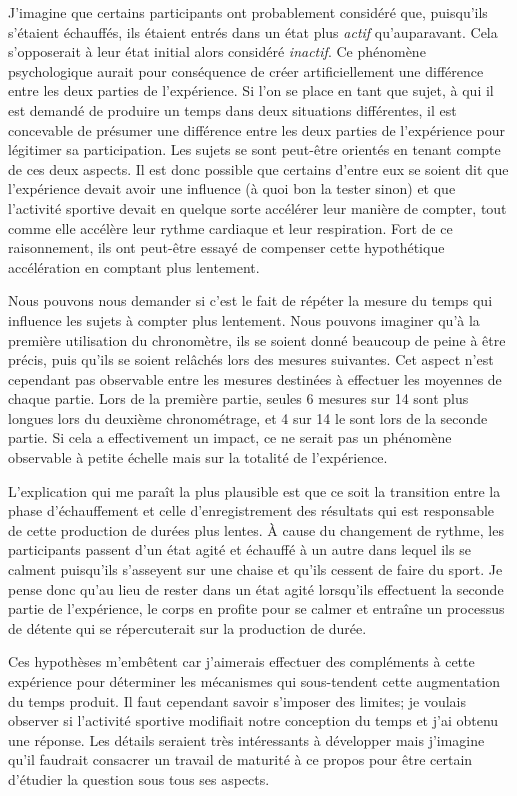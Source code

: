 \documentclass[12pt,fleqn,oneside,french,openany]{book} %
\begin{document}
J'imagine que certains participants ont probablement considéré que, puisqu'ils s'étaient échauffés, ils étaient entrés dans un état plus \emph{actif} qu'auparavant. Cela s'opposerait à leur état initial alors considéré \emph{inactif}. Ce phénomène psychologique aurait pour conséquence de créer artificiellement une différence entre les deux parties de l'expérience. Si l'on se place en tant que sujet, à qui il est demandé de produire un temps dans deux situations différentes, il est concevable de présumer une différence entre les deux parties de l'expérience pour légitimer sa participation. Les sujets se sont peut-être orientés en tenant compte de ces deux aspects. Il est donc possible que certains d'entre eux se soient dit que l'expérience devait avoir une influence (à quoi bon la tester sinon) et que l'activité sportive devait en quelque sorte accélérer leur manière de compter, tout comme elle accélère leur rythme cardiaque et leur respiration. Fort de ce raisonnement, ils ont peut-être essayé de compenser cette hypothétique accélération en comptant plus lentement.

Nous pouvons nous demander si c'est le fait de répéter la mesure du temps qui influence les sujets à compter plus lentement. Nous pouvons imaginer qu'à la première utilisation du chronomètre, ils se soient donné beaucoup de peine à être précis, puis qu'ils se soient relâchés lors des mesures suivantes. Cet aspect n'est cependant pas observable entre les mesures destinées à effectuer les moyennes de chaque partie. Lors de la première partie, seules 6 mesures sur 14 sont plus longues lors du deuxième chronométrage, et 4 sur 14 le sont lors de la seconde partie. Si cela a effectivement un impact, ce ne serait pas un phénomène observable à petite échelle mais sur la totalité de l'expérience.

L'explication qui me paraît la plus plausible est que ce soit la transition entre la phase d'échauffement et celle d'enregistrement des résultats qui est responsable de cette production de durées plus lentes. À cause du changement de rythme, les participants passent d'un état agité et échauffé à un autre dans lequel ils se calment puisqu'ils s'asseyent sur une chaise et qu'ils cessent de faire du sport. Je pense donc qu'au lieu de rester dans un état agité lorsqu'ils effectuent la seconde partie de l'expérience, le corps en profite pour se calmer et entraîne un processus de détente qui se répercuterait sur la production de durée.

Ces hypothèses m'embêtent car j'aimerais effectuer des compléments à cette expérience pour déterminer les mécanismes qui sous-tendent cette augmentation du temps produit. Il faut cependant savoir s'imposer des limites; je voulais observer si l'activité sportive modifiait notre conception du temps et j'ai obtenu une réponse. Les détails seraient très intéressants à développer mais j'imagine qu'il faudrait consacrer un travail de maturité à ce propos pour être certain d'étudier la question sous tous ses aspects.
\end{document}
